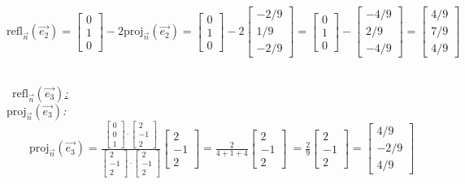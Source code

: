 \documentclass{article}
\begin{document}
 \\\\
$
\text{refl}_{\vec{n}}(\vec{e_2})=
\begin{bmatrix}0\\1\\0\end{bmatrix}
-2\text{proj}_{\vec{n}}(\vec{e_2})
=\begin{bmatrix}0\\1\\0\end{bmatrix}-2\begin{bmatrix}-2/9\\1/9\\-2/9\end{bmatrix}
=\begin{bmatrix}0\\1\\0\end{bmatrix}-\begin{bmatrix}-4/9\\2/9\\-4/9\end{bmatrix}
=\begin{bmatrix}4/9\\7/9\\4/9\end{bmatrix}$

 \\ \underline{\textit{$\text{refl}_{\vec{n}}(\vec{e_3})$:}}\\
\textit{$\text{proj}_{\vec{n}}(\vec{e_3})$:}\\
$\text{
      proj}_{\vec{n}}(\vec{e_3})=\frac
{
\begin{bmatrix}0\\0\\1\end{bmatrix}\cdot\begin{bmatrix}2\\-1\\2\end{bmatrix}
}{
\begin{bmatrix}2\\-1\\2\end{bmatrix}\cdot\begin{bmatrix}2\\-1\\2\end{bmatrix}
}
\begin{bmatrix}2\\-1\\2\end{bmatrix}
=\frac{2}{4+1+4}\begin{bmatrix}2\\-1\\2\end{bmatrix}\
=\frac{2}{9}\begin{bmatrix}2\\-1\\2\end{bmatrix}
=\begin{bmatrix}4/9\\-2/9\\4/9\end{bmatrix}$
\end{document}
